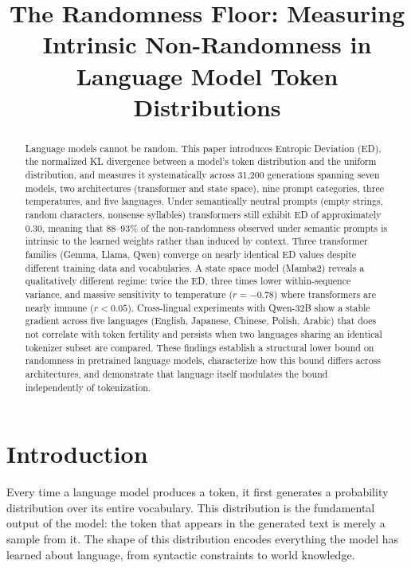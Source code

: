 \documentclass{article}
\title{The Randomness Floor: Measuring Intrinsic Non-Randomness in Language Model Token Distributions}
\author{}
\begin{document}
\ifcolmsubmission
\linenumbers
\fi

\maketitle

\begin{abstract}
Language models cannot be random. This paper introduces Entropic Deviation (ED), the normalized KL divergence between a model's token distribution and the uniform distribution, and measures it systematically across 31,200 generations spanning seven models, two architectures (transformer and state space), nine prompt categories, three temperatures, and five languages. Under semantically neutral prompts (empty strings, random characters, nonsense syllables) transformers still exhibit ED of approximately 0.30, meaning that 88--93\% of the non-randomness observed under semantic prompts is intrinsic to the learned weights rather than induced by context. Three transformer families (Gemma, Llama, Qwen) converge on nearly identical ED values despite different training data and vocabularies. A state space model (Mamba2) reveals a qualitatively different regime: twice the ED, three times lower within-sequence variance, and massive sensitivity to temperature ($r = -0.78$) where transformers are nearly immune ($r < 0.05$). Cross-lingual experiments with Qwen-32B show a stable gradient across five languages (English, Japanese, Chinese, Polish, Arabic) that does not correlate with token fertility and persists when two languages sharing an identical tokenizer subset are compared. These findings establish a structural lower bound on randomness in pretrained language models, characterize how this bound differs across architectures, and demonstrate that language itself modulates the bound independently of tokenization.
\end{abstract}

\section{Introduction}
\label{sec:intro}

Every time a language model produces a token, it first generates a probability distribution over its entire vocabulary. This distribution is the fundamental output of the model: the token that appears in the generated text is merely a sample from it. The shape of this distribution encodes everything the model has learned about language, from syntactic constraints to world knowledge.
\end{document}
